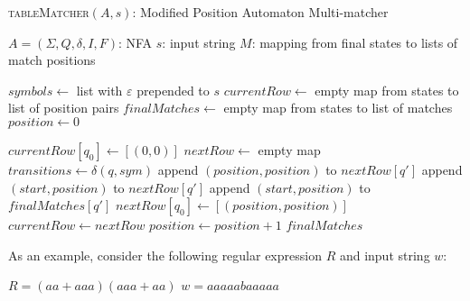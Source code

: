 \begin{algorithm}[H]
\caption{\textsc{tableMatcher}$(A, s)$: Modified Position Automaton Multi-matcher}
\label{alg:table-matcher}
\begin{small}
\begin{algorithmic}[1]
\Require $A = (\Sigma, Q, \delta, I, F)$: NFA
\Require $s$: input string
\Ensure $M$: mapping from final states to lists of match positions

\State $symbols \gets$ list with $\varepsilon$ prepended to $s$
\State $currentRow \gets$ empty map from states to list of position pairs
\State $finalMatches \gets$ empty map from states to list of matches
\State $position \gets 0$

            \State $currentRow[q_0] \gets [(0, 0)]$
        \EndFor
    \Else
        \State $nextRow \gets$ empty map
                \State $transitions \gets \delta(q, sym)$
                                \State append $(position, position)$ to $nextRow[q']$
                            \Else
                                \State append $(start, position)$ to $nextRow[q']$
                                    \State append $(start, position)$ to $finalMatches[q']$
                                \EndIf
                            \EndIf
                        \EndFor
                    \EndFor
                \EndIf
            \EndFor
        \Else
                \State $nextRow[q_0] \gets [(position, position)]$
            \EndFor
        \EndIf
        \State $currentRow \gets nextRow$
        \State $position \gets position + 1$
    \EndIf
\EndFor
\State \Return $finalMatches$
\end{algorithmic}
\end{small}
\end{algorithm}

\clearpage

As an example, consider the following regular expression $R$ and input string $w$:
\begin{center}
	$R = (aa+aaa)(aaa+aa)$ \break
	$w = aaaaabaaaaa$
\end{center}

